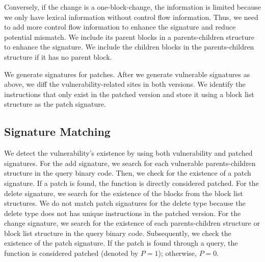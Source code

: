 Conversely, if the change is a one-block-change, the information is limited because we only have lexical information without control flow information. 
Thus, we need to add more control flow information to enhance the signature and reduce potential mismatch. 
We include its parent blocks in a parents-children structure to enhance the signature. 
We include the children blocks in the parents-children structure if it has no parent block.  

We generate signatures for patches. 
After we generate vulnerable signatures as above, we diff the vulnerability-related sites in both versions. 
We identify the instructions that only exist in the patched version and store it using a block list structure as the patch signature.


\subsection{Signature Matching}
We detect the vulnerability's existence by using both vulnerability and patched signatures. 
For the add signature, we search for each vulnerable parents-children structure in the query binary code. 
Then, we check for the existence of a patch signature. 
If a patch is found, the function is directly considered patched. 
For the delete signature, we search for the existence of the blocks from the block list structures. 
We do not match patch signatures for the delete type because the delete type does not has unique instructions in the patched version. 
For the change signature, we search for the existence of each parents-children structure or block list structure in the query binary code. Subsequently, we check the existence of the patch signature. 
If the patch is found through a query, the function is considered patched (denoted by $P=1$);  otherwise, $P=0$. 

